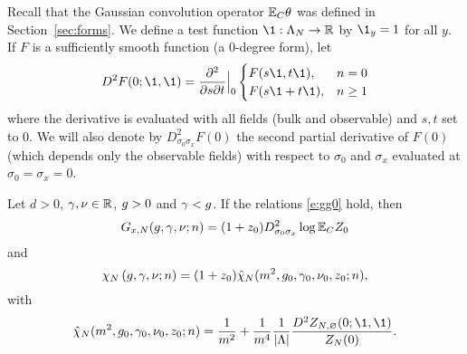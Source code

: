 Recall that the Gaussian convolution operator $\mathbb{E}_C\theta$ was defined in
Section~\ref{sec:forms}. We define a test function $\1: \Lambda_N \to \R$ by
$\1_y=1$ for all $y$. If $F$ is a sufficiently smooth function (a $0$-degree form),
let
\begin{equation}
D^2 F(0; \1, \1)
  =
\ddp{^2}{s\partial t}\Big|_0
\begin{cases}
F(s \1, t\1), & n = 0 \\
F(s \1 + t\1), & n \ge 1
\end{cases}
\end{equation}
where the derivative is evaluated with all fields (bulk and observable) and $s, t$ set to $0$.
We will also denote by $D^2_{\sigma_0\sigma_x} F(0)$ the second partial derivative of $F(0)$
(which depends only the observable fields)
with respect to $\sigma_0$ and $\sigma_x$ evaluated at $\sigma_0 = \sigma_x = 0$.

\begin{prop}
\label{prop:intrep}
Let $d > 0$, $\gamma, \nu \in {\mathbb R}$, $g >0$ and $\gamma <g$.
If the relations \eqref{e:gg0} hold, then
\begin{equation}
\label{e:generating-fn}
G_{x,N}(g, \gamma, \nu; n)
	=
(1+z_0)
D^2_{\sigma_0\sigma_x}
\log \mathbb{E}_C Z_0
\end{equation}
and
\begin{equation}
\label{e:chichibar}
\chi_N\left(g,\gamma,\nu; n\right)
	=
(1+z_0)\hat\chi_N(m^2, g_0, \gamma_0, \nu_0, z_0; n),
\end{equation}
with
\begin{equation}
\label{e:chibarm}
\hat\chi_N(m^2, g_0, \gamma_0, \nu_0, z_0; n)
	=
\frac{1}{m^2}
	+
\frac{1}{m^4} \frac{1}{|\Lambda|} \frac{D^2 Z_{N,\varnothing}(0; \1, \1)}{Z_N(0)}.
\end{equation}
\end{prop}

